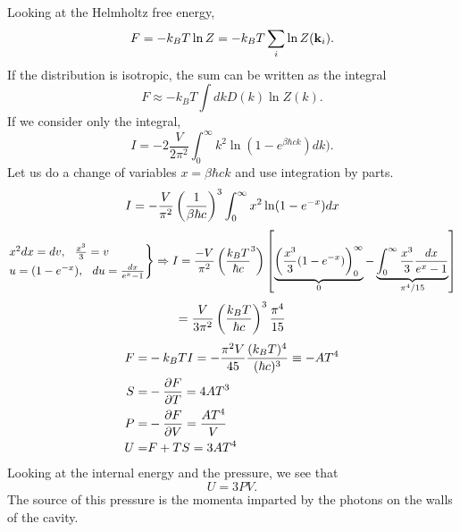     Looking at the Helmholtz free energy,
    \begin{equation}
        F = -k_BT\ln Z = -k_BT\sum_i\ln Z(\mathbf{k}_i).
    \end{equation}
    If the distribution is isotropic, the sum can be written as the integral
    \begin{equation}
        F \approx -k_BT\int dk D(k)\ln Z(k).
    \end{equation}
    If we consider only the integral,
    \begin{equation}
        I = -2\frac{V}{2\pi^2}\int_{0}^{\infty}k^2\ln(1-e^{\beta\hbar ck})dk).
    \end{equation}
    Let us do a change of variables $x=\beta\hbar ck$ and use integration by parts.
    \begin{equation}
        I = -\frac{V}{\pi^2}\left( \frac{1}{\beta\hbar c} \right)^3\int_{0}^{\infty}x^2\ln(1-e^{-x})dx
    \end{equation}
    \begin{equation}
        \begin{rcases}
            x^2dx = dv ,\hspace{0.25cm} \frac{x^3}{3}=v\\
            u = (1-e^{-x} ),\hspace{0.25cm} du = \frac{dx}{e^x-1}
        \end{rcases} \Rightarrow I = \frac{-V}{\pi^2}\left( \frac{k_BT}{\hbar c}^3 \right)\left[ \underbrace{\left( \frac{x^3}{3}(1-e^{-x}) \right)_0^\infty}_0 - \underbrace{\int_{0}^{\infty}\frac{x^3}{3}\frac{dx}{e^x-1}}_{\pi^4/15} \right]\notag
    \end{equation}
    \begin{equation}
         = \frac{V}{3\pi^2}\left( \frac{k_BT}{\hbar c} \right)^3\frac{\pi^4}{15}
    \end{equation}
    \begin{align}
        F =& -k_BTI=-\frac{\pi^2V}{45}\frac{(k_BT)^4}{(\hbar c)^3}\equiv -AT^4\\
        S =& -\frac{\partial F}{\partial T}=4AT^3\\
        P =& -\frac{\partial F}{\partial V}=\frac{AT^4}{V} \\
        U =& F+TS=3AT^4
    \end{align}
    Looking at the internal energy and the pressure, we see that
    \begin{equation}
        U =3PV.
    \end{equation}
    The source of this pressure is the momenta imparted by the photons on the walls of the cavity.


